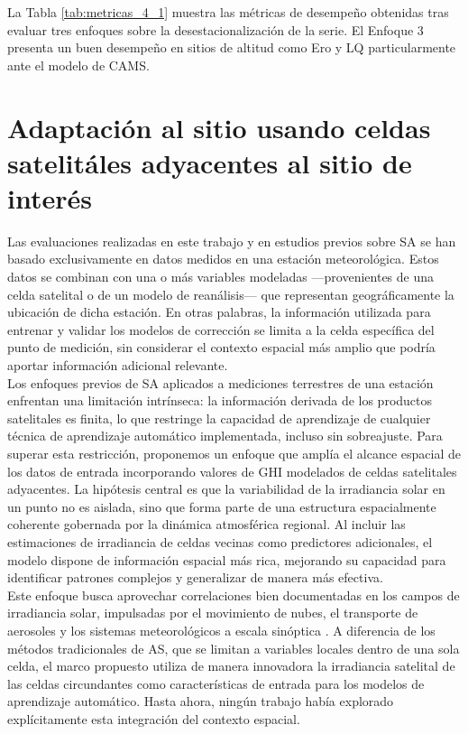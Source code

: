 La Tabla \ref{tab:metricas_4_1} muestra las métricas de desempeño obtenidas tras evaluar tres enfoques sobre la desestacionalización de la serie. El Enfoque 3 presenta un buen desempeño en sitios de altitud como Ero y LQ particularmente ante el modelo de CAMS.





\section{Adaptación al sitio usando celdas satelitáles adyacentes al sitio de interés}
Las evaluaciones realizadas en este trabajo y en estudios previos sobre SA se han basado exclusivamente en datos medidos en una estación meteorológica. Estos datos se combinan con una o más variables modeladas —provenientes de una celda satelital o de un modelo de reanálisis— que representan geográficamente la ubicación de dicha estación. En otras palabras, la información utilizada para entrenar y validar los modelos de corrección se limita a la celda específica del punto de medición, sin considerar el contexto espacial más amplio que podría aportar información adicional relevante.\\

Los enfoques previos de SA aplicados a mediciones terrestres de una estación enfrentan una limitación intrínseca: la información derivada de los productos satelitales es finita, lo que restringe la capacidad de aprendizaje de cualquier técnica de aprendizaje automático implementada, incluso sin sobreajuste. Para superar esta restricción, proponemos un enfoque que amplía el alcance espacial de los datos de entrada incorporando valores de GHI modelados de celdas satelitales adyacentes. La hipótesis central es que la variabilidad de la irradiancia solar en un punto no es aislada, sino que forma parte de una estructura espacialmente coherente gobernada por la dinámica atmosférica regional. Al incluir las estimaciones de irradiancia de celdas vecinas como predictores adicionales, el modelo dispone de información espacial más rica, mejorando su capacidad para identificar patrones complejos y generalizar de manera más efectiva.\\

Este enfoque busca aprovechar correlaciones bien documentadas en los campos de irradiancia solar, impulsadas por el movimiento de nubes, el transporte de aerosoles y los sistemas meteorológicos a escala sinóptica \citep{IHSAN2024}. A diferencia de los métodos tradicionales de AS, que se limitan a variables locales dentro de una sola celda, el marco propuesto utiliza de manera innovadora la irradiancia satelital de las celdas circundantes como características de entrada para los modelos de aprendizaje automático. Hasta ahora, ningún trabajo había explorado explícitamente esta integración del contexto espacial.



